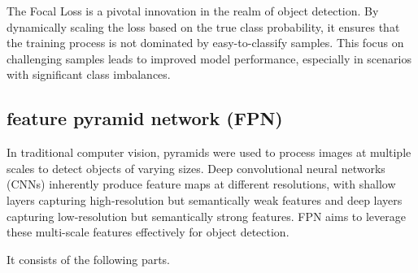 \documentclass{article}
\begin{document}

The Focal Loss is a pivotal innovation in the realm of object detection. By dynamically scaling the loss based on the true class probability, it ensures that the training process is not dominated by easy-to-classify samples. This focus on challenging samples leads to improved model performance, especially in scenarios with significant class imbalances.

\subsection{feature pyramid network (FPN)}

In traditional computer vision, pyramids were used to process images at multiple scales to detect objects of varying sizes.
Deep convolutional neural networks (CNNs) inherently produce feature maps at different resolutions, with shallow layers capturing high-resolution but semantically weak features and deep layers capturing low-resolution but semantically strong features.
FPN \cite{lin2017feature} aims to leverage these multi-scale features effectively for object detection.

It consists of the following parts.
\end{document}

